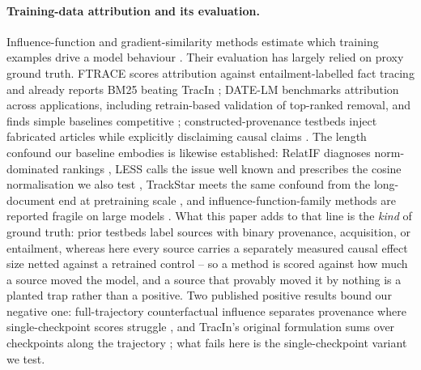 \documentclass[10pt]{article}
\begin{document}
\paragraph{Training-data attribution and its evaluation.}
Influence-function and gradient-similarity methods estimate which training examples drive a
model behaviour \citep{koh2017influence,pruthi2020tracin,grosse2023influence}. Their evaluation
has largely relied on proxy ground truth. FTRACE scores attribution against entailment-labelled
fact tracing and already reports BM25 beating TracIn \citep{akyurek2022ftrace}; DATE-LM
benchmarks attribution across applications, including retrain-based validation of top-ranked
removal, and finds simple baselines competitive \citep{jiao2025datelm}; constructed-provenance
testbeds inject fabricated articles while explicitly disclaiming causal claims
\citep{li2025fakewiki}. The length confound our baseline embodies is likewise established:
RelatIF diagnoses norm-dominated rankings \citep{barshan2020relatif}, LESS calls the issue well
known and prescribes the cosine normalisation we also test \citep{xia2024less}, TrackStar meets
the same confound from the long-document end at pretraining scale \citep{chang2025trackstar},
and influence-function-family methods are reported fragile on large models
\citep{li2025influencework}. What this paper adds to that line is the \emph{kind} of ground
truth: prior testbeds label sources with binary provenance, acquisition, or entailment, whereas
here every source carries a separately measured causal effect size netted against a retrained
control -- so a method is scored against how much a source moved the model, and a source that
provably moved it by nothing is a planted trap rather than a positive. Two published positive
results bound our negative one: full-trajectory counterfactual influence separates provenance
where single-checkpoint scores struggle \citep{brazilek2026smalledits}, and TracIn's original
formulation sums over checkpoints along the trajectory \citep{pruthi2020tracin}; what fails
here is the single-checkpoint variant we test.
\end{document}
